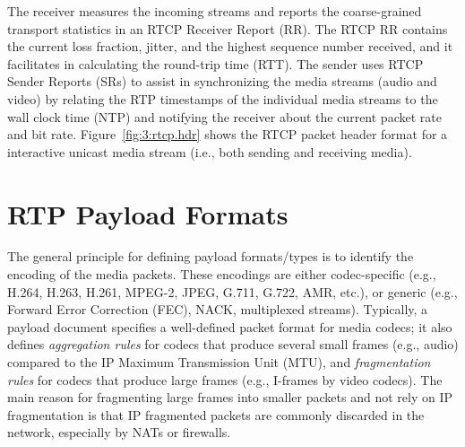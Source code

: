 
The receiver measures the incoming streams and reports the coarse-grained
transport statistics in an RTCP Receiver Report (RR). The RTCP RR contains the
current loss fraction, jitter, and the highest sequence number received, and it
facilitates in calculating the round-trip time (RTT). The sender uses RTCP Sender Reports (SRs)
to assist in synchronizing the media streams (audio and video) by relating the
RTP timestamps of the individual media streams to the wall clock time (NTP)
and notifying the receiver about the current packet rate and bit rate.
Figure~\ref{fig:3:rtcp.hdr} shows the RTCP packet header format for a
interactive unicast media stream (i.e., both sending and receiving media).

\section{RTP Payload Formats}

The general principle for defining payload formats/types is to 
identify the encoding of the media packets. These encodings are either  
codec-specific (e.g., H.264, H.263, H.261, MPEG-2, JPEG, G.711, G.722, AMR, etc.),
or generic (e.g., Forward Error Correction (FEC), NACK, multiplexed streams).
Typically, a payload document specifies a well-defined packet format for media
codecs; it also defines \emph{aggregation rules} for codecs that produce
several small frames (e.g., audio) compared to the IP Maximum Transmission
Unit (MTU), and \emph{fragmentation rules} for codecs that produce large frames
(e.g., I-frames by video codecs). The main reason for fragmenting large
frames into smaller packets and not rely on IP fragmentation is that IP
fragmented packets are commonly discarded in the network, especially by NATs
or firewalls.


